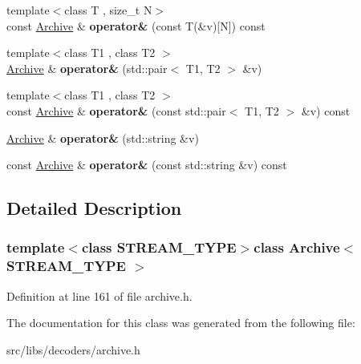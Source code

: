 \begin{DoxyCompactItemize}
\item 
\hypertarget{classArchive_a95a7f390298754a291b7c909fce99fbf}{{\footnotesize template$<$class T , size\-\_\-t N$>$ }\\const \hyperlink{classArchive}{Archive} \& {\bfseries operator\&} (const T(\&v)\mbox{[}N\mbox{]}) const }\label{classArchive_a95a7f390298754a291b7c909fce99fbf}

\item 
\hypertarget{classArchive_a3362b77e779af7a675753079c758ef8f}{{\footnotesize template$<$class T1 , class T2 $>$ }\\\hyperlink{classArchive}{Archive} \& {\bfseries operator\&} (std\-::pair$<$ T1, T2 $>$ \&v)}\label{classArchive_a3362b77e779af7a675753079c758ef8f}

\item 
\hypertarget{classArchive_a9e642671cc1962a4d3d6450bb3ab9bb0}{{\footnotesize template$<$class T1 , class T2 $>$ }\\const \hyperlink{classArchive}{Archive} \& {\bfseries operator\&} (const std\-::pair$<$ T1, T2 $>$ \&v) const }\label{classArchive_a9e642671cc1962a4d3d6450bb3ab9bb0}

\item 
\hypertarget{classArchive_aca2fe7bb6d8de44203f1cdb8f22d8c05}{\hyperlink{classArchive}{Archive} \& {\bfseries operator\&} (std\-::string \&v)}\label{classArchive_aca2fe7bb6d8de44203f1cdb8f22d8c05}

\item 
\hypertarget{classArchive_affb47b55c7b941ac6ce02e87c0ba0838}{const \hyperlink{classArchive}{Archive} \& {\bfseries operator\&} (const std\-::string \&v) const }\label{classArchive_affb47b55c7b941ac6ce02e87c0ba0838}

\end{DoxyCompactItemize}


\subsection{Detailed Description}
\subsubsection*{template$<$class S\-T\-R\-E\-A\-M\-\_\-\-T\-Y\-P\-E$>$class Archive$<$ S\-T\-R\-E\-A\-M\-\_\-\-T\-Y\-P\-E $>$}



Definition at line 161 of file archive.\-h.



The documentation for this class was generated from the following file\-:\begin{DoxyCompactItemize}
\item 
src/libs/decoders/archive.\-h\end{DoxyCompactItemize}
